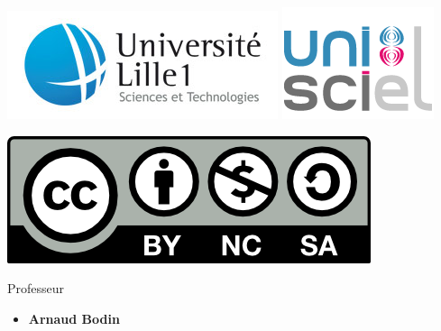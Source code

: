 








\begin{frame}

\thispagestyle{empty}    

  \hspace*{-20ex}
  \begin{minipage}{0.35\textwidth}
  \begin{center}
    \vspace*{5ex}   


    \bigskip

    \includegraphics[scale=0.3]{../divers/logotypeLille1-QUADRI-ECRAN.jpg}
    \quad
    \includegraphics[scale=0.3]{../divers/logo-unisciel.png}

    \vspace*{5ex}

    \includegraphics[scale=0.5]{../divers/by-nc-sa.png}
  \end{center}
  \end{minipage}
  \hfil
  \begin{minipage}{0.90\textwidth}
  \footnotesize
   \vspace*{2ex}
  Professeur
  \begin{itemize}
    \item {\bf Arnaud Bodin}  
  \end{itemize} 
  

\end{minipage}
\end{frame}
